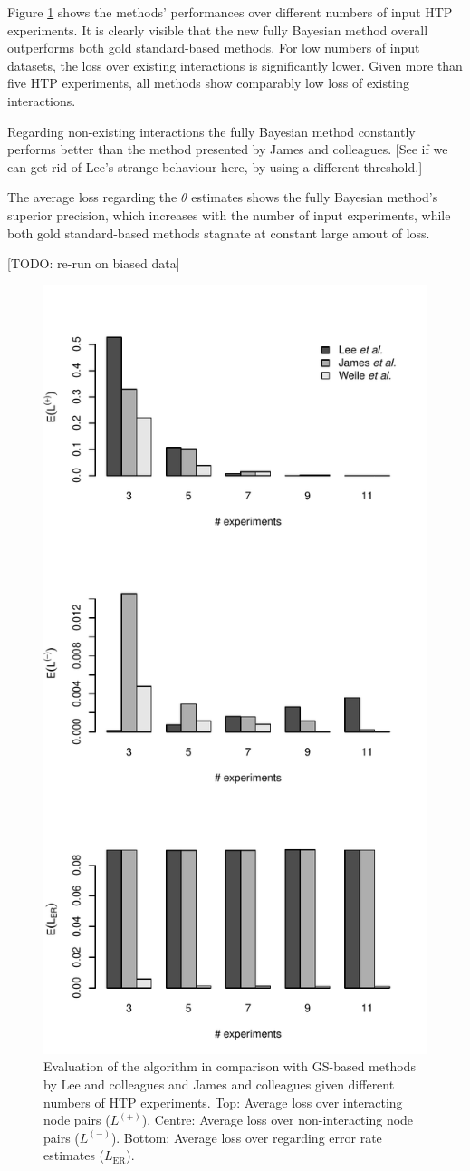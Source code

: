 \documentclass{bioinfo}
\newcommand{\note}[1]{{\color{red}[#1]}}
\begin{document}
Figure \ref{htp} shows the methods' performances over different numbers of input HTP experiments. It is clearly visible that the new fully Bayesian method overall outperforms both gold standard-based methods. For low numbers of input datasets, the loss over existing interactions is significantly lower. Given more than five HTP experiments, all methods show comparably low loss of existing interactions. 

Regarding non-existing interactions the fully Bayesian method constantly performs better than the method presented by James and colleagues. \note{See if we can get rid of Lee's strange behaviour here, by using a different threshold.}

The average loss regarding the $\theta$ estimates shows the fully Bayesian method's superior precision, which increases with the number of input experiments, while both gold standard-based methods stagnate at constant large amout of loss.

\note{TODO: re-run on biased data}

\begin{figure}[!tpb]
\centerline{\includegraphics[width=.5\textwidth]{fig1.pdf}}
\caption{Evaluation of the algorithm in comparison with GS-based methods by Lee and colleagues and James and colleagues given different numbers of HTP experiments. Top: Average loss over interacting node pairs ($L^{(+)}$). Centre: Average loss over non-interacting node pairs ($L^{(-)}$). Bottom: Average loss over regarding error rate estimates ($L_\text{ER}$).}
\label{htp}
\end{figure}
\end{document}
